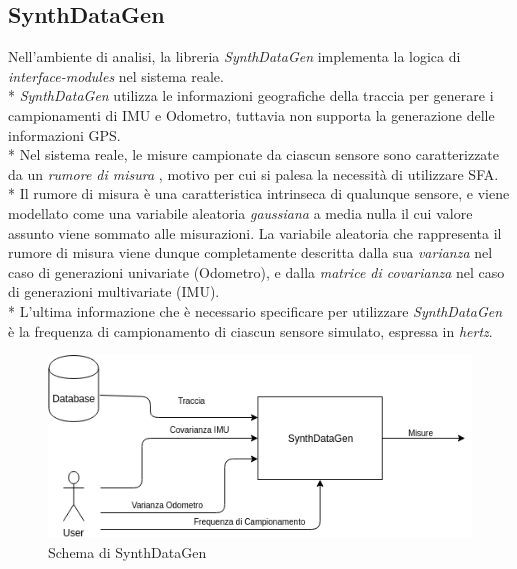 \subsection{SynthDataGen}
Nell'ambiente di analisi, la libreria \emph{SynthDataGen} implementa la logica di \emph{interface-modules} nel sistema reale.\\*
\emph{SynthDataGen} utilizza le informazioni geografiche della traccia per generare i campionamenti di IMU e Odometro, tuttavia non supporta la generazione delle informazioni GPS.\\*
Nel sistema reale, le misure campionate da ciascun sensore sono caratterizzate da un \emph{rumore di misura} \cite{measnoise}, motivo per cui si palesa la necessit\`a di utilizzare SFA.\\*
Il rumore di misura \`e una caratteristica intrinseca di qualunque sensore, e viene modellato come una variabile aleatoria \emph{gaussiana} a media nulla il cui valore assunto viene sommato alle misurazioni. La variabile aleatoria che rappresenta il rumore di misura viene dunque completamente descritta dalla sua \emph{varianza} nel caso di generazioni univariate (Odometro), e dalla \emph{matrice di covarianza} nel caso di generazioni multivariate (IMU).\\*
L'ultima informazione che \`e necessario specificare per utilizzare \emph{SynthDataGen} \`e la frequenza di campionamento di ciascun sensore simulato, espressa in \emph{hertz}.
\begin{figure}[h]
	\centering
	\includegraphics[width=0.7\linewidth]{img/SynthDataGen}
	\caption{Schema di SynthDataGen}
	\label{fig:SynthDG}
\end{figure}
